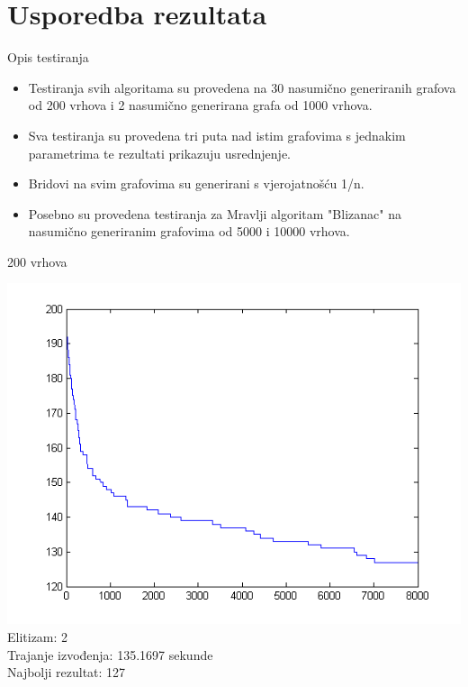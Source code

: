 \documentclass{beamer}
\begin{document}
\section{Usporedba rezultata}
\begin{frame}{Opis testiranja}
\begin{itemize}
\item Testiranja svih algoritama su provedena na 30 nasumično generiranih grafova od 200 vrhova i 2 nasumično generirana grafa od 1000 vrhova.
\item Sva testiranja su provedena tri puta nad istim grafovima s jednakim parametrima te rezultati prikazuju usrednjenje.
\item Bridovi na svim grafovima su generirani s vjerojatnošću 1/n.
\item Posebno su provedena testiranja za Mravlji algoritam "Blizanac" na nasumično generiranim grafovima od 5000 i 10000 vrhova.
\end{itemize}
\end{frame}


\begin{frame}{200 vrhova}
\begin{center}
\includegraphics[scale = 0.55]{par2.png}\\
\tiny
Elitizam: 2\\
Trajanje izvođenja: 135.1697 sekunde\\
Najbolji rezultat: 127\\
\end{center}
\end{frame}
\end{document}
